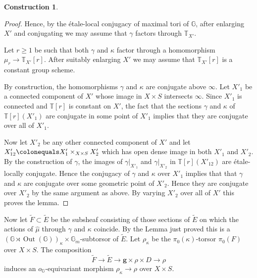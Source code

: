 \documentclass{article}
\newcommand{\BG}{{\mathbb{G}}}
\newcommand{\BT}{{\mathbb{T}}}
\newcommand{\CE}{{\mathcal E}}
\DeclareMathOperator{\Out}{Out}
\newcommand{\defeq}{\colonequals}
\theoremstyle{definition}
\newtheorem{construction}[definition]{Construction}
\theoremstyle{plain}
\begin{document}
\begin{construction}
\begin{proof}
Hence, by the \'etale-local conjugacy of maximal tori of $\BG$, after enlarging $X'$ and conjugating we may assume that $\gamma$ factors through $\BT_{X'}$. 

Let $r\geq 1$ be such that both $\gamma$ and $\kappa$ factor through a homomorphism $\mu_r \to \BT_{X'}[r]$. After suitably enlarging $X'$ we may assume that $\BT_{X'}[r]$ is a constant group scheme.



 By construction, the homomorphisms $\gamma$ and $\kappa$ are conjugate above $\infty$. Let $X'_1$ be a connected component of $X'$ whose image in $X\times S$ intersects $\infty$. Since $X'_1$ is connected and $\BT[r]$ is constant on $X'$, the fact that the sections $\gamma$ and $\kappa$ of $\BT[r](X'_1)$ are conjugate in some point of $X'_1$ implies that they are conjugate over all of $X'_1$. 

Now let $X'_2$ be any other connected component of $X'$ and let $X'_{12}\defeq X'_1 \times_{X\times S} X'_2$ which has open dense image in both $X'_1$ and $X'_2$. By the construction of $\gamma$, the images of $\gamma|_{X'_1}$ and $\gamma|_{X'_2}$ in $\BT[r](X'_{12})$ are \'etale-locally conjugate. Hence the conjugacy of $\gamma$ and $\kappa$ over $X'_1$ implies that that $\gamma$ and $\kappa$ are conjugate over some geometric point of $X'_2$. Hence they are conjugate over $X'_2$ by the same argument as above. By varying $X'_2$ over all of $X'$ this proves the lemma.
  \end{proof}

Now let $\tilde F \subset \tilde E$ be the subsheaf consisting of those sections of $\tilde E$ on which the actions of $\hat\mu$ through $\gamma$ and $\kappa$ coincide. By the Lemma just proved this is a $(\BG \rtimes \Out(\BG))_\kappa \times \BG_m$-subtorsor of $\tilde E$. Let $\rho_\kappa$ be the $\pi_0(\kappa)$-torsor $\pi_0(F)$ over $X \times S$. The composition 
\begin{equation*}
  \tilde F \to \tilde E \to \mathbf{g} \times \rho \times D \to \rho
\end{equation*}
induces an $o_\BG$-equivariant morphism $\rho_\kappa \to \rho$ over $X \times S$. %




\end{construction}
\end{document}
